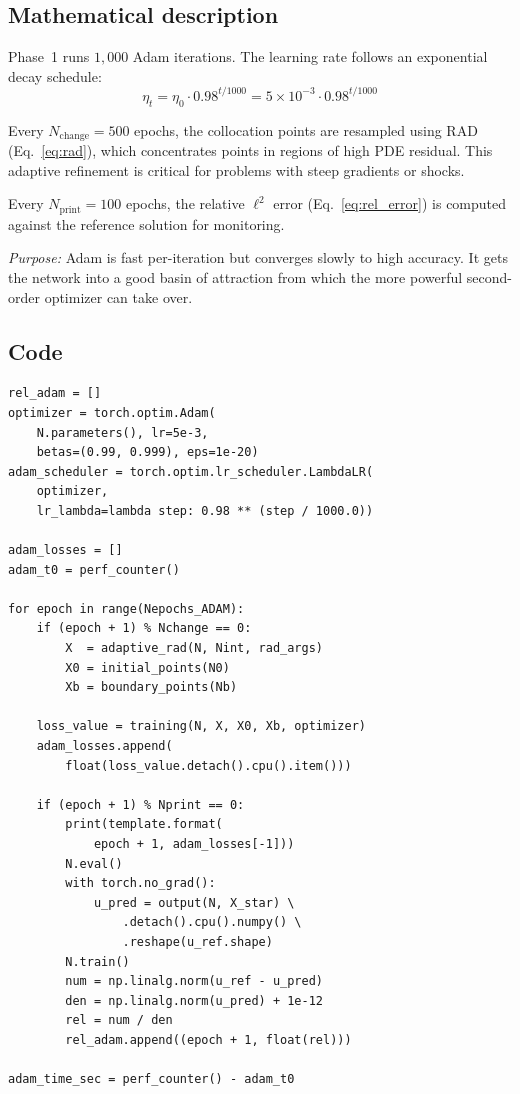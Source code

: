 \documentclass[11pt,a4paper]{article}
\begin{document}
\subsection*{Mathematical description}

Phase~1 runs $1{,}000$ Adam iterations. The learning rate follows an
exponential decay schedule:
\begin{equation}
  \eta_t = \eta_0 \cdot 0.98^{t/1000}
  = 5\times10^{-3} \cdot 0.98^{t/1000}
\label{eq:lr_schedule}
\end{equation}

Every $N_{\mathrm{change}} = 500$ epochs, the collocation points are
resampled using RAD (Eq.~\eqref{eq:rad}), which concentrates points
in regions of high PDE residual.  This adaptive refinement is critical
for problems with steep gradients or shocks.

Every $N_{\mathrm{print}} = 100$ epochs, the relative $\ell^2$ error
(Eq.~\eqref{eq:rel_error}) is computed against the reference solution
for monitoring.

\emph{Purpose:} Adam is fast per-iteration but converges slowly to
high accuracy.  It gets the network into a good basin of attraction
from which the more powerful second-order optimizer can take over.

\subsection*{Code}

\begin{lstlisting}
rel_adam = []
optimizer = torch.optim.Adam(
    N.parameters(), lr=5e-3,
    betas=(0.99, 0.999), eps=1e-20)
adam_scheduler = torch.optim.lr_scheduler.LambdaLR(
    optimizer,
    lr_lambda=lambda step: 0.98 ** (step / 1000.0))

adam_losses = []
adam_t0 = perf_counter()

for epoch in range(Nepochs_ADAM):
    if (epoch + 1) % Nchange == 0:
        X  = adaptive_rad(N, Nint, rad_args)
        X0 = initial_points(N0)
        Xb = boundary_points(Nb)

    loss_value = training(N, X, X0, Xb, optimizer)
    adam_losses.append(
        float(loss_value.detach().cpu().item()))

    if (epoch + 1) % Nprint == 0:
        print(template.format(
            epoch + 1, adam_losses[-1]))
        N.eval()
        with torch.no_grad():
            u_pred = output(N, X_star) \
                .detach().cpu().numpy() \
                .reshape(u_ref.shape)
        N.train()
        num = np.linalg.norm(u_ref - u_pred)
        den = np.linalg.norm(u_pred) + 1e-12
        rel = num / den
        rel_adam.append((epoch + 1, float(rel)))

adam_time_sec = perf_counter() - adam_t0
\end{lstlisting}
\end{document}
